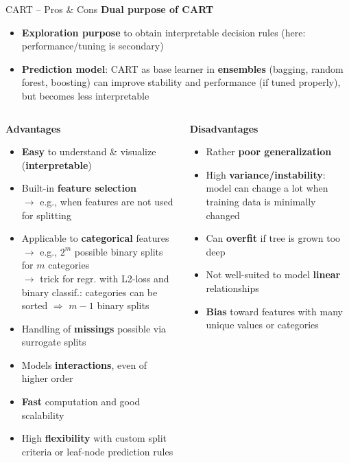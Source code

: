 \documentclass[11pt,compress,t,notes=noshow, xcolor=table]{beamer}
\newcommand{\highlight}[1]{\textcolor{hlcol}{\textbf{#1}}}
\newcommand{\positem}{\item[\textcolor{hlcol}{$\bm{+}$}]}
\newcommand{\negitem}{\item[\textcolor{hlcol}{$\bm{-}$}]}
\begin{document}
\begin{vbframe}{CART -- Pros \& Cons}
  \highlight{Dual purpose of CART} ~~ 
\begin{itemize}
    \item \textbf{Exploration purpose} to obtain interpretable decision rules (here: performance/tuning is secondary)
    \item \textbf{Prediction model}: CART as base learner in \textbf{ensembles} (bagging, random forest, boosting) can improve stability and performance (if tuned properly), but becomes less interpretable
\end{itemize}

\medskip
\begin{columns}[onlytextwidth]
  \begin{column}{0.5\textwidth}
    \highlight{Advantages}
    \footnotesize
    \begin{itemize}
      \positem \textbf{Easy} to understand \& visualize (\textbf{interpretable})
      \positem Built-in \textbf{feature selection}\\
      $\rightarrow$ e.g., when features are not used for splitting
      \positem Applicable to \textbf{categorical} features \\
      $\rightarrow$ e.g., $2^m$ possible binary splits for $m$ categories\\
       $\rightarrow$ trick for regr. with L2-loss and binary classif.: categories can be sorted $\Rightarrow$ $m-1$ binary splits 
      \positem Handling of \textbf{missings} possible via surrogate splits
      \positem Models  \textbf{interactions}, 
      even of higher order
      \positem \textbf{Fast} computation and good scalability
      \positem High \textbf{flexibility} with custom split criteria or leaf-node 
      prediction rules
    \end{itemize}
  \end{column}
  \begin{column}{0.5\textwidth}
    \highlight{Disadvantages}
    \footnotesize
    \begin{itemize}
      \negitem Rather \textbf{poor generalization} %
      \negitem High \textbf{variance/instability}: model can change a lot when training data is minimally changed
      \negitem Can \textbf{overfit} if tree is grown too deep
      \negitem Not well-suited to model \textbf{linear} relationships
      \negitem \textbf{Bias} toward features with many unique values or categories
    \end{itemize}
  \end{column}
\end{columns}
\end{vbframe}
\end{document}
